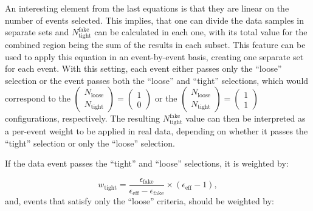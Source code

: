 An interesting element from the last equations is that they are linear on the number of events selected.
This implies, that one can divide the data samples
in separate sets and $N^{\mathrm{fake}}_{\mathrm{tight}}$ can be calculated in each one, with its total value for the combined
region being the sum of the results in each subset.
This feature can be used to apply this equation in an event-by-event basis, creating one separate set for each event.
With this setting, each event either passes only the ``loose'' selection or the event passes both the ``loose'' and ``tight'' selections,
which would correspond to the $\begin{pmatrix} N_{\mathrm{loose}}\\ N_{\mathrm{tight}}\end{pmatrix} = \begin{pmatrix} 1 \\ 0\end{pmatrix}$
or the $\begin{pmatrix} N_{\mathrm{loose}}\\ N_{\mathrm{tight}}\end{pmatrix} = \begin{pmatrix} 1 \\ 1\end{pmatrix}$ configurations,
respectively. The resulting $N^{\mathrm{fake}}_{\mathrm{tight}}$ value can then be interpreted as a per-event weight to be applied in
real data, depending on whether it passes the ``tight'' selection or only the ``loose'' selection.

If the data event passes the ``tight'' and ``loose'' selections, it is weighted by:


\begin{equation}
\displaystyle
w_{\mathrm{tight}} = \frac{\epsilon_{\mathrm{fake}}}{\epsilon_{\mathrm{eff}} - \epsilon_{\mathrm{fake}}} \times ( \epsilon_{\mathrm{eff}} - 1 ),
\label{eq:mmqcd_wtight}
\end{equation}
and, events that satisfy only the ``loose'' criteria, should be weighted by:


